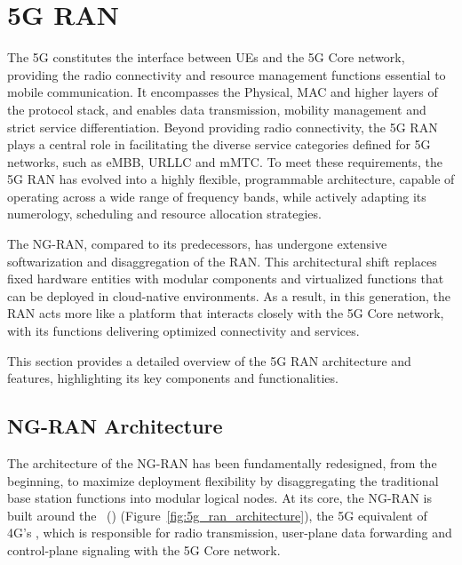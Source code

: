 \section{5G RAN}
\label{sec:5g_ran}
The 5G  constitutes the interface between \glspl{UE} and the 5G Core network, providing the radio connectivity and resource management functions essential to mobile communication. It encompasses the Physical, \gls{MAC} and higher layers of the protocol stack, and enables data transmission, mobility management and strict service differentiation.
Beyond providing radio connectivity, the 5G \gls{RAN} plays a central role in facilitating the diverse service categories defined for 5G networks, such as \gls{eMBB}, \gls{URLLC} and \gls{mMTC}. To meet these requirements, the 5G \gls{RAN} has evolved into a highly flexible, programmable architecture, capable of operating across a wide range of frequency bands, while actively adapting its numerology, scheduling and resource allocation strategies.

The \gls{NG-RAN}, compared to its predecessors, has undergone extensive softwarization and disaggregation of the \gls{RAN}. This architectural shift replaces fixed hardware entities with modular components and virtualized functions that can be deployed in cloud-native environments. As a result, in this generation, the \gls{RAN} acts more like a platform that interacts closely with the 5G Core network, with its functions delivering optimized connectivity and services.

This section provides a detailed overview of the 5G \gls{RAN} architecture and features, highlighting its key components and functionalities.

\subsection{\gls{NG-RAN} Architecture}
\label{sec:ran_architecture}

The architecture of the \gls{NG-RAN} has been fundamentally redesigned, from the beginning, to maximize deployment flexibility by disaggregating the traditional base station functions into modular logical nodes. At its core, the \gls{NG-RAN} is built around the ~() (Figure~\ref{fig:5g_ran_architecture}), the 5G equivalent of 4G's , which is responsible for radio transmission, user-plane data forwarding and control-plane signaling with the 5G Core network.

